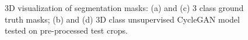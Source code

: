 \begin{figure}[!htb]
\centering
{}\hfil
{}

\hfil 
{}

\caption{3D visualization of segmentation masks: (a) and (c) 3 class ground truth masks; (b) and (d) \ac{3D} class unsupervised CycleGAN model tested on pre-processed test crops.}

\label{fig:results-cycleGAN-3channel}



\end{figure}

